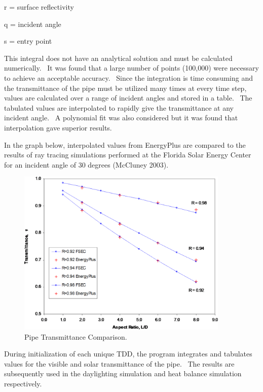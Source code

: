 r = surface reflectivity

q = incident angle

s = entry point

This integral does not have an analytical solution and must be calculated numerically.~ It was found that a large number of points (100,000) were necessary to achieve an acceptable accuracy.~ Since the integration is time consuming and the transmittance of the pipe must be utilized many times at every time step, values are calculated over a range of incident angles and stored in a table.~ The tabulated values are interpolated to rapidly give the transmittance at any incident angle.~ A polynomial fit was also considered but it was found that interpolation gave superior results.

In the graph below, interpolated values from EnergyPlus are compared to the results of ray tracing simulations performed at the Florida Solar Energy Center for an incident angle of 30 degrees (McCluney 2003).

\begin{figure}[hbtp] %
\centering
\includegraphics[width=0.9\textwidth, height=0.9\textheight, keepaspectratio=true]{media/image874.png}
\caption{  Pipe Transmittance Comparison. \protect \label{fig:pipe-transmittance-comparison.}}
\end{figure}

During initialization of each unique TDD, the program integrates and tabulates values for the visible and solar transmittance of the pipe.~ The results are subsequently used in the daylighting simulation and heat balance simulation respectively.

